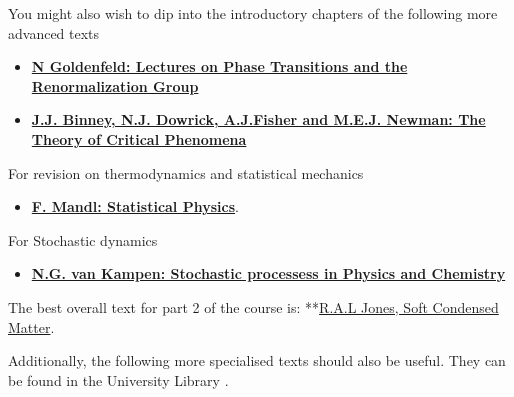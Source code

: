 \documentclass[
  letterpaper,
  enabledeprecatedfontcommands]{report}
\providecommand{\tightlist}{%
  \setlength{\itemsep}{0pt}\setlength{\parskip}{0pt}}
\begin{document}
You might also wish to dip into the introductory chapters of the
following more advanced texts

\begin{itemize}
\item
  \textbf{\href{https://bris.on.worldcat.org/search/detail/25914535?queryString=Lectures\%20on\%20Phase\%20Transitions\%20and\%20the\%20Renormalization\%20Group&clusterResults=true&stickyFacetsChecked=true&groupVariantRecords=false&newsArticles=off&bookReviews=off}{N
  Goldenfeld: Lectures on Phase Transitions and the Renormalization
  Group}}
\item
  \textbf{\href{https://bris.on.worldcat.org/search/detail/861559276?queryString=\%20The\%20Theory\%20of\%20Critical\%20Phenomena&clusterResults=true&stickyFacetsChecked=true&groupVariantRecords=false&newsArticles=off&bookReviews=off}{J.J.
  Binney, N.J. Dowrick, A.J.Fisher and M.E.J. Newman: The Theory of
  Critical Phenomena}}
\end{itemize}

For revision on thermodynamics and statistical mechanics

\begin{itemize}
\tightlist
\item
  \textbf{\href{https://bris.on.worldcat.org/search/detail/15487191?queryString=F.\%20Mandl&clusterResults=true&stickyFacetsChecked=true&groupVariantRecords=false}{F.
  Mandl: Statistical Physics}}.
\end{itemize}

For Stochastic dynamics

\begin{itemize}
\tightlist
\item
  \textbf{\href{https://bris.on.worldcat.org/search/detail/162131511?queryString=Stochastic\%20Processes\%20in\%20Physics\%20and\%20Chemistry\%20by\%20N.G.\%20van\%20Kampen&clusterResults=true&stickyFacetsChecked=true&groupVariantRecords=false}{N.G.
  van Kampen: Stochastic processess in Physics and Chemistry}}
\end{itemize}

The best overall text for part 2 of the course is:
**\href{https://bris.on.worldcat.org/search/detail/48753186?queryString=soft\%20condensed\%20matter&clusterResults=true&stickyFacetsChecked=true&groupVariantRecords=false}{R.A.L
Jones, Soft Condensed Matter}.

Additionally, the following more specialised texts should also be
useful. They can be found in the University Library .
\end{document}
